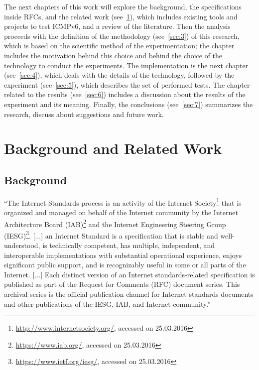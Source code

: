 \documentclass[12pt]{article}
\begin{document}
The next chapters of this work will explore the background, the specifications inside RFCs, and the related work (see~\cref{sec:2}), which includes existing tools and projects to test ICMPv6, and a review of the literature. Then the analysis proceeds with the definition of the methodology (see~\cref{sec:3}) of this research, which is based on the scientific method of the experimentation; the chapter includes the motivation behind this choice and behind the choice of the technology to conduct the experiments. The implementation is the next chapter (see~\cref{sec:4}), which deals with the details of the technology, followed by the experiment (see~\cref{sec:5}), which describes the set of performed tests. The chapter related to the results (see~\cref{sec:6}) includes a discussion about the results of the experiment and its meaning. Finally, the conclusions (see~\cref{sec:7}) summarizes the research, discuss about suggestions and future work.

 

\pagebreak
\section{Background and Related Work}
\label{sec:2}


\subsection{Background}
\label{sub:background}

``The Internet Standards process is an activity of the Internet Society\footnote{\url{http://www.internetsociety.org/}, accessed on 25.03.2016} that is organized and managed on behalf of the Internet community by the Internet Architecture Board (IAB)\footnote{\url{https://www.iab.org/}, accessed on 25.03.2016} and the Internet Engineering Steering Group (IESG)\footnote{\url{https://www.ietf.org/iesg/}, accessed on 25.03.2016}. [...] an Internet Standard is a specification that is stable and well-understood, is technically competent, has multiple, independent, and interoperable implementations with substantial operational experience, enjoys significant public support, and is recognizably useful in some or all parts of the Internet. [...] Each distinct version of an Internet standards-related specification is published as part of the Request for Comments (RFC) document series.  This archival series is the official publication channel for Internet standards documents and other publications of the IESG, IAB, and Internet community.''\cite{rfc2026}
\end{document}

